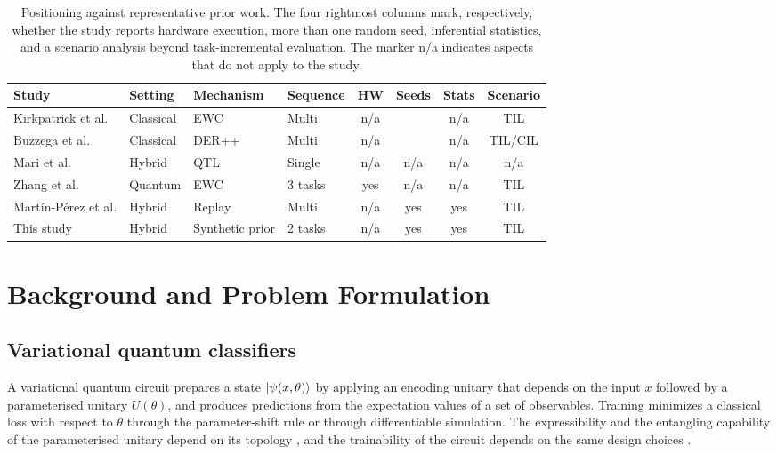 \documentclass[preprint,number,sort&compress]{elsarticle}
\begin{document}
\begin{table}[ht]
\centering
\caption{Positioning against representative prior work. The four rightmost
columns mark, respectively, whether the study reports hardware execution,
more than one random seed, inferential statistics, and a scenario analysis
beyond task-incremental evaluation. The marker n/a indicates aspects that do not
apply to the study.}
\label{tab:comparison}
\setlength{\tabcolsep}{5pt}
\begin{tabular}{llllccc c}
\toprule
Study & Setting & Mechanism & Sequence & HW & Seeds & Stats & Scenario \\
\midrule
Kirkpatrick et al. \cite{kirkpatrick2017overcoming} & Classical & EWC & Multi & n/a & ~ & n/a & TIL \\
Buzzega et al. \cite{buzzega2020dark} & Classical & DER++ & Multi & n/a & ~ & n/a & TIL/CIL \\
Mari et al. \cite{mari2020transfer} & Hybrid & QTL & Single & n/a & n/a & n/a & n/a \\
Zhang et al. \cite{Zhang26} & Quantum & EWC & 3 tasks & yes & n/a & n/a & TIL \\
Mart\'in-P\'erez et al. \cite{martinperez2026derpp} & Hybrid & Replay & Multi & n/a & yes & yes & TIL \\
This study & Hybrid & Synthetic prior & 2 tasks & n/a & yes & yes & TIL \\
\bottomrule
\end{tabular}
\end{table}

\section{Background and Problem Formulation}
\label{sec:background}

\subsection{Variational quantum classifiers}

A variational quantum circuit prepares a state $\ket{\psi(x,\theta)}$ by
applying an encoding unitary that depends on the input $x$ followed by a
parameterised unitary $U(\theta)$, and produces predictions from the
expectation values of a set of observables. Training minimizes a classical
loss with respect to $\theta$ through the parameter-shift rule
\cite{Mitarai18} or through differentiable simulation. The
expressibility and the entangling capability of the parameterised unitary
depend on its topology \cite{sim2019expressibility, grant2018hierarchical},
and the trainability of the circuit depends on the same design choices
\cite{mcclean2018barren, pesah2021absence}.
\end{document}
